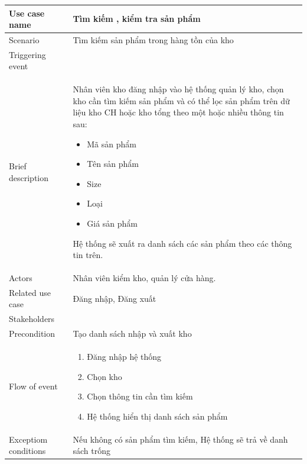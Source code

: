 \documentclass{article}
\begin{document}
	\begin{tabular}{|m{4cm}|m{12cm}|}
		\hline
		Use case name & Tìm kiếm , kiểm tra sản phẩm \\
		\hline
		Scenario & Tìm kiếm sản phẩm trong hàng tồn của kho \\
		\hline
		Triggering event & \\
		\hline
		Brief description & Nhân viên kho đăng nhập vào hệ thống quản lý kho, chọn kho cần tìm kiếm sản phẩm và có thể lọc sản phẩm trên dữ liệu kho CH hoặc kho tổng theo một hoặc nhiều thông tin sau:
		\begin{itemize}
			\item Mã sản phẩm
			\item Tên sản phẩm
			\item Size
			\item Loại 
			\item Giá sản phẩm
		\end{itemize}
		Hệ thống sẽ xuất ra danh sách các sản phẩm theo các thông tin trên.\\
		\hline
		 Actors & Nhân viên kiểm kho, quản lý cửa hàng.\\
		\hline
		Related use case & Đăng nhập, Đăng xuất \\
		\hline
		Stakeholders & \\
		\hline
		Precondition & Tạo danh sách nhập và xuất kho\\
		\hline
		Flow of event & 
			\begin{enumerate}
			\item Đăng nhập hệ thống
			\item Chọn kho
			\item Chọn thông tin cần tìm kiếm
			\item Hệ thống hiển thị danh sách sản phẩm 
			\end{enumerate}\\
		\hline
		Exceptiom conditions & Nếu không có sản phẩm tìm kiếm, Hệ thống sẽ trả về danh sách trống \\
		\hline
	\end{tabular}
\end{document}
